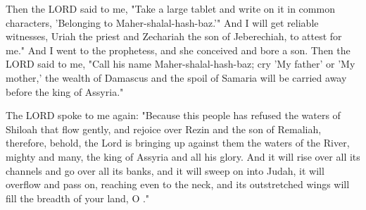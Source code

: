 \documentclass[11pt]{article}
\begin{document}
\begin{biblicaloutline}[Isaiah 8:1-4]

    \begin{versesection}{2em}
         Then the LORD said to me, "Take a large tablet and write on it in common characters, 'Belonging to Maher-shalal-hash-baz.'"  And I will get reliable witnesses, Uriah the priest and Zechariah the son of Jeberechiah, to attest for me."  And I went to the prophetess, and she conceived and bore a son. Then the LORD said to me, "Call his name Maher-shalal-hash-baz;   cry 'My father' or 'My mother,' the wealth of Damascus and the spoil of Samaria will be carried away before the king of Assyria."
    \end{versesection}

\end{biblicaloutline}

\begin{biblicaloutline}[Isaiah 8:5-8]

    \begin{versesection}{2em}
         The LORD spoke to me again:  "Because this people has refused the waters of Shiloah that flow gently, and rejoice over Rezin and the son of Remaliah,  therefore, behold, the Lord is bringing up against them the waters of the River, mighty and many, the king of Assyria and all his glory. And it will rise over all its channels and go over all its banks,  and it will sweep on into Judah, it will overflow and pass on, reaching even to the neck, and its outstretched wings will fill the breadth of your land, O ."
    \end{versesection}

\end{biblicaloutline}

\begin{biblicaloutline}[Isaiah 8:9-10]

    \begin{versesection}{2em}
        
    \end{versesection}

\end{biblicaloutline}
\end{document}
